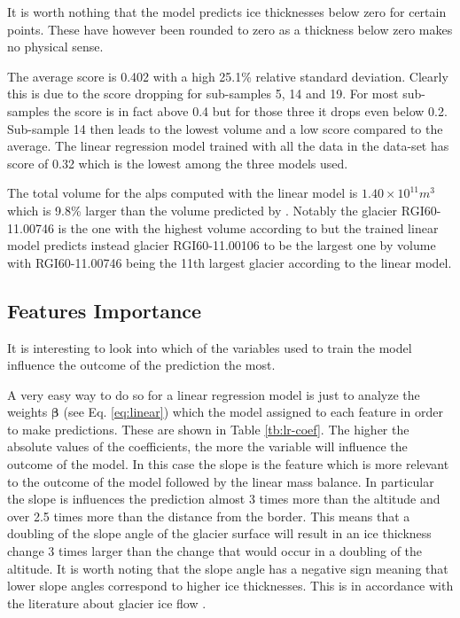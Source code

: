 It is worth nothing that the model predicts ice thicknesses below zero for certain points. These have however been rounded to zero as a thickness below zero makes no physical sense.

The average score is 0.402 with a high 25.1\% relative standard deviation. Clearly this is due to the score dropping for sub-samples 5, 14 and 19. For most sub-samples the score is in fact above 0.4 but for those three it drops even below 0.2. Sub-sample 14 then leads to the lowest volume and a low score compared to the average.
The linear regression model trained with all the data in the data-set has score of 0.32 which  is the lowest among the three models used.

The total volume for the alps computed with the linear model is $1.40 \times 10^{11}m^3$ which is 9.8\% larger than the volume predicted by \citet{Farinotti2019}. Notably the glacier RGI60-11.00746 is the one with the highest volume according to \citet{Farinotti2019} but  the trained linear model predicts instead glacier RGI60-11.00106 to be the largest one by volume with RGI60-11.00746 being the 11th largest glacier according to the linear model.

\subsection{Features Importance}  

It is interesting to look into which of the variables used to train the model influence the outcome of the prediction the most.

A very easy way to do so for a linear regression model is just to analyze the weights $\bm{\beta}$ (see Eq. \ref{eq:linear}) which the model assigned to each feature in order to make predictions. These are shown in Table \ref{tb:lr-coef}.
The higher the absolute values of the coefficients, the more the variable will influence the outcome of the model. In this case the slope is the feature which is more relevant to the outcome of the model followed by the linear mass balance. In particular the slope is influences the prediction almost 3 times more than the altitude and over 2.5 times more than the distance from the border. This means that a doubling of the slope angle of the glacier surface will result in an ice thickness change 3 times larger than the change that would occur in a doubling of the altitude. It is worth noting that the slope angle has a negative sign meaning that lower slope angles correspond to higher ice thicknesses. This is in accordance with the literature about glacier ice flow \cite[P. 286]{cuffey2010physics}.

